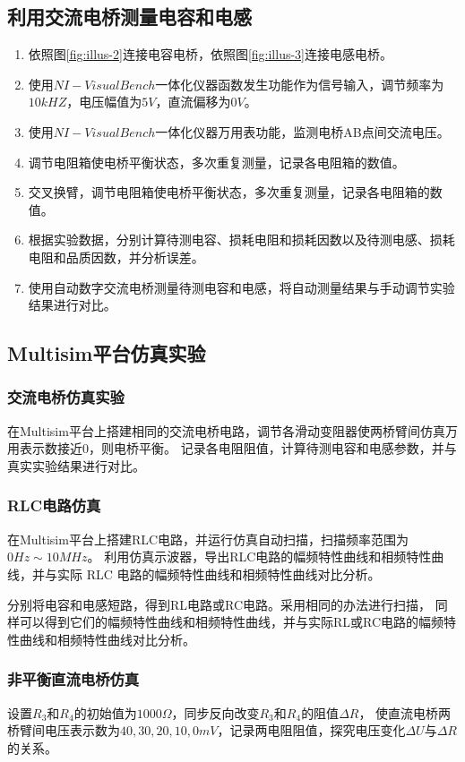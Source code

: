 \documentclass[10pt,a4paper,twocolumn,twoside,UTF8]{ctexart}
\begin{document}
	\subsection{利用交流电桥测量电容和电感}
	\begin{enumerate}[label=\arabic*.]
		\item 依照图\ref{fig:illus-2}连接电容电桥，依照图\ref{fig:illus-3}连接电感电桥。
		\item 使用$NI-VisualBench$一体化仪器函数发生功能作为信号输入，调节频率为$10kHZ$，电压幅值为$5V$，直流偏移为$0V$。
	 	\item 使用$NI-VisualBench$一体化仪器万用表功能，监测电桥AB点间交流电压。
	 	\item 调节电阻箱使电桥平衡状态，多次重复测量，记录各电阻箱的数值。
	 	\item 交叉换臂，调节电阻箱使电桥平衡状态，多次重复测量，记录各电阻箱的数值。
	 	\item 根据实验数据，分别计算待测电容、损耗电阻和损耗因数以及待测电感、损耗电阻和品质因数，并分析误差。
	 	\item 使用自动数字交流电桥测量待测电容和电感，将自动测量结果与手动调节实验结果进行对比。
	\end{enumerate}

	\subsection{Multisim平台仿真实验}
		\subsubsection{交流电桥仿真实验}
		在Multisim平台上搭建相同的交流电桥电路，调节各滑动变阻器使两桥臂间仿真万用表示数接近0，则电桥平衡。
		记录各电阻阻值，计算待测电容和电感参数，并与真实实验结果进行对比。
		\subsubsection{RLC电路仿真}
		在Multisim平台上搭建RLC电路，并运行仿真自动扫描，扫描频率范围为$0Hz \sim 10MHz$。
		利用仿真示波器，导出RLC电路的幅频特性曲线和相频特性曲线，并与实际 RLC 电路的幅频特性曲线和相频特性曲线对比分析。

		分别将电容和电感短路，得到RL电路或RC电路。采用相同的办法进行扫描，
		同样可以得到它们的幅频特性曲线和相频特性曲线，并与实际RL或RC电路的幅频特性曲线和相频特性曲线对比分析。
		\subsubsection{非平衡直流电桥仿真}
		设置$R_3$和$R_4$的初始值为$1000\Omega$，同步反向改变$R_3$和$R_4$的阻值$\Delta R$，
		使直流电桥两桥臂间电压表示数为$40,30,20,10,0mV$，记录两电阻阻值，探究电压变化$\Delta U$与$\Delta R$的关系。
\end{document}
